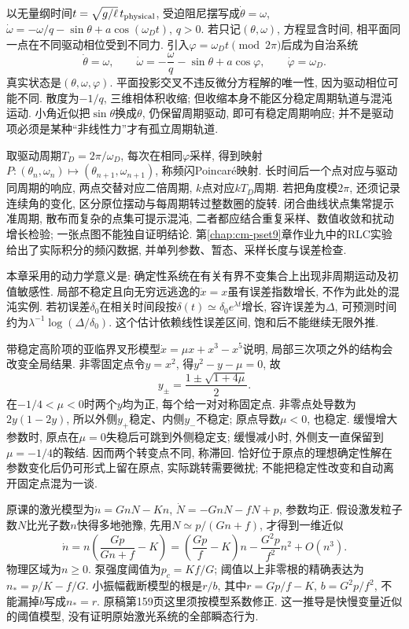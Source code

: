 以无量纲时间$t=\sqrt{g/\ell}\,t_{\rm physical}$, 受迫阻尼摆写成$\dot\theta=\omega$, $\dot\omega=-\omega/q-\sin\theta+a\cos(\omega_Dt)$, $q>0$. 若只记$(\theta,\omega)$, 方程显含时间, 相平面同一点在不同驱动相位受到不同力. 引入$\varphi=\omega_Dt\pmod{2\pi}$后成为自治系统
\[
\dot\theta=\omega,\qquad
\dot\omega=-\frac\omega q-\sin\theta+a\cos\varphi,\qquad
\dot\varphi=\omega_D.
\]
真实状态是$(\theta,\omega,\varphi)$. 平面投影交叉不违反微分方程解的唯一性, 因为驱动相位可能不同. 散度为$-1/q$, 三维相体积收缩; 但收缩本身不能区分稳定周期轨道与混沌运动. 小角近似把$\sin\theta$换成$\theta$, 仍保留周期驱动, 即可有稳定周期响应; 并不是驱动项必须是某种“非线性力”才有孤立周期轨道.

取驱动周期$T_D=2\pi/\omega_D$, 每次在相同$\varphi$采样, 得到映射$P:(\theta_n,\omega_n)\mapsto(\theta_{n+1},\omega_{n+1})$, 称频闪Poincaré映射. 长时间后一个点对应与驱动同周期的响应, 两点交替对应二倍周期, $k$点对应$kT_D$周期. 若把角度模$2\pi$, 还须记录连续角的变化, 区分原位摆动与每周期转过整数圈的旋转. 闭合曲线状点集常提示准周期, 散布而复杂的点集可提示混沌, 二者都应结合重复采样、数值收敛和扰动增长检验; 一张点图不能独自证明结论. 第\ref{chap:cm-pset9}章作业九中的RLC实验给出了实际积分的频闪数据, 并单列参数、暂态、采样长度与误差检查.

本章采用的动力学意义是: 确定性系统在有关有界不变集合上出现非周期运动及初值敏感性. 局部不稳定且向无穷远逃逸的$\dot x=x$虽有误差指数增长, 不作为此处的混沌实例. 若初误差$\delta_0$在相关时间段按$\delta(t)\simeq\delta_0e^{\lambda t}$增长, 容许误差为$\Delta$, 可预测时间约为$\lambda^{-1}\log(\Delta/\delta_0)$. 这个估计依赖线性误差区间, 饱和后不能继续无限外推.

带稳定高阶项的亚临界叉形模型$\dot x=\mu x+x^3-x^5$说明, 局部三次项之外的结构会改变全局结果. 非零固定点令$y=x^2$, 得$y^2-y-\mu=0$, 故
\[
y_\pm=\frac{1\pm\sqrt{1+4\mu}}2.
\]
在$-1/4<\mu<0$时两个$y$均为正, 每个给一对对称固定点. 非零点处导数为$2y(1-2y)$, 所以外侧$y_+$稳定、内侧$y_-$不稳定; 原点导数$\mu<0$, 也稳定. 缓慢增大参数时, 原点在$\mu=0$失稳后可跳到外侧稳定支; 缓慢减小时, 外侧支一直保留到$\mu=-1/4$的鞍结. 因而两个转变点不同, 称滞回. 恰好位于原点的理想确定性解在参数变化后仍可形式上留在原点, 实际跳转需要微扰; 不能把稳定性改变和自动离开固定点混为一谈.

原课的激光模型为$\dot n=GnN-Kn$, $\dot N=-GnN-fN+p$, 参数均正. 假设激发粒子数$N$比光子数$n$快得多地弛豫, 先用$N\simeq p/(Gn+f)$, 才得到一维近似
\[
\dot n=n\left(\frac{Gp}{Gn+f}-K\right)
=\left(\frac{Gp}f-K\right)n-\frac{G^2p}{f^2}n^2+O(n^3).
\]
物理区域为$n\ge0$. 泵强度阈值为$p_c=Kf/G$; 阈值以上非零根的精确表达为$n_*=p/K-f/G$. 小振幅截断模型的根是$r/b$, 其中$r=Gp/f-K$, $b=G^2p/f^2$, 不能漏掉$b$写成$n_*=r$. 原稿第159页这里须按模型系数修正. 这一推导是快慢变量近似的阈值模型, 没有证明原始激光系统的全部瞬态行为.

